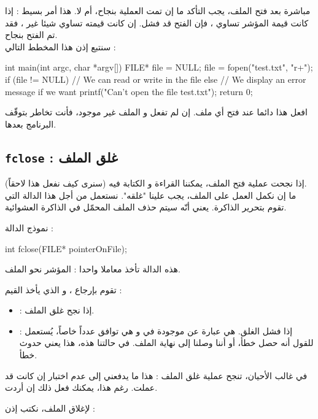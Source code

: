مباشرة بعد فتح الملف، يجب التأكد ما إن تمت العملية بنجاح، أم لا. هذا أمر بسيط : إذا كانت قيمة المؤشر تساوي
،
فإن الفتح قد فشل. إن كانت قيمته تساوي شيئا غير
،
فقد تم الفتح بنجاح.\\
سنتبع إذن هذا المخطط التالي :

\begin{Csource}
int main(int argc, char *argv[])
{
	FILE* file = NULL;
	file = fopen("test.txt", "r+");
	if (file != NULL)
	{
    		// We can read or write in the file
	}
	else
	{
    		// We display an error message if we want
    		printf("Can't open the file test.txt");
	}
	return 0;
}
\end{Csource}

افعل هذا دائما عند فتح أي ملف. إن لم تفعل و الملف غير موجود، فأنت تخاطر بتوقّف البرنامج بعدها.

\subsection{\texttt{fclose} : غلق الملف}

إذا نجحت عملية فتح الملف، يمكننا القراءة و الكتابة فيه (سنرى كيف نفعل هذا لاحقاً).\\
ما إن نكمل العمل على الملف، يجب علينا "غلقه". نستعمل من أجل هذا الدالة
التي تقوم بتحرير الذاكرة. يعني أنّه سيتم حذف الملف المحمّل في الذاكرة العشوائية.

نموذج الدالة :

\begin{Csource}
int fclose(FILE* pointerOnFile);
\end{Csource}

هذه الدالة تأخذ معاملا واحدا : المؤشر نحو الملف.

تقوم بإرجاع
،
و الذي يأخذ القيم :

\begin{itemize}
  \item {} : إذا نجح غلق الملف.
  \item {} : إذا فشل الغلق.
هي عبارة عن
موجودة في
و هي توافق عدداً خاصاً، يُستعمل للقول أنه حصل خطأ، أو أننا وصلنا إلى نهاية الملف. في حالتنا هذه، هذا يعني حدوث خطأ.
\end{itemize}

في غالب الأحيان، تنجح عملية غلق الملف : هذا ما يدفعني إلى عدم اختبار إن كانت
قد عملت. رغم هذا، يمكنك فعل ذلك إن أردت.

لإغلاق الملف، نكتب إذن :

